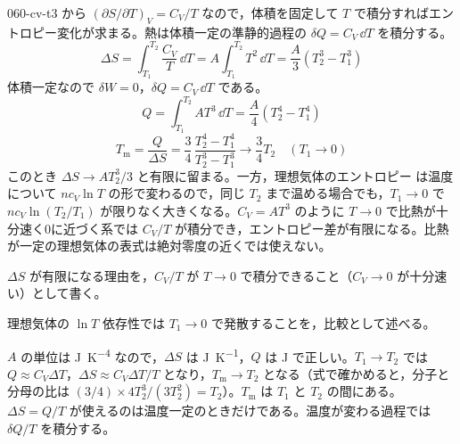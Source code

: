 \documentclass[uplatex,dvipdfmx,a4paper,11pt]{jsarticle}
\begin{document}
\kaitouhen
{}
\begin{kaisetsu}{060-cv-t3}
\houshin {} から $(\partial S/\partial T)_{V} = C_{V}/T$ なので，体積を固定して $T$ で積分すればエントロピー変化が求まる。熱は体積一定の準静的過程の $\delta Q = C_{V}\,\dd T$ を積分する。
\keisan {}
\[ \Delta S = \int_{T_{1}}^{T_{2}} \frac{C_{V}}{T}\,\dd T = A\int_{T_{1}}^{T_{2}} T^{2}\,\dd T = \frac{A}{3}\left(T_{2}^{3} - T_{1}^{3}\right) \]
 体積一定なので $\delta W = 0$，$\delta Q = C_{V}\,\dd T$ である。
\[ Q = \int_{T_{1}}^{T_{2}} AT^{3}\,\dd T = \frac{A}{4}\left(T_{2}^{4} - T_{1}^{4}\right) \]
\[ T_{\mathrm{m}} = \frac{Q}{\Delta S} = \frac{3}{4}\,\frac{T_{2}^{4} - T_{1}^{4}}{T_{2}^{3} - T_{1}^{3}} \longrightarrow \frac{3}{4}T_{2} \quad (T_{1} \to 0) \]
このとき $\Delta S \to AT_{2}^{3}/3$ と有限に留まる。一方，理想気体のエントロピー  は温度について $nc_{V}\ln T$ の形で変わるので，同じ $T_{2}$ まで温める場合でも，$T_{1} \to 0$ で $nc_{V}\ln(T_{2}/T_{1})$ が限りなく大きくなる。$C_{V} = AT^{3}$ のように $T \to 0$ で比熱が十分速く0に近づく系では $C_{V}/T$ が積分でき，エントロピー差が有限になる。比熱が一定の理想気体の表式は絶対零度の近くでは使えない。
\begin{ronten}
  \item {} $\Delta S$ が有限になる理由を，$C_{V}/T$ が $T \to 0$ で積分できること（$C_{V} \to 0$ が十分速い）として書く。
  \item {} 理想気体の $\ln T$ 依存性では $T_{1} \to 0$ で発散することを，比較として述べる。
\end{ronten}
\kenzan $A$ の単位は \unit{\joule\per\kelvin\tothe{4}} なので，$\Delta S$ は \unit{\joule\per\kelvin}，$Q$ は \unit{\joule} で正しい。$T_{1} \to T_{2}$ では $Q \approx C_{V}\Delta T$，$\Delta S \approx C_{V}\Delta T/T$ となり，$T_{\mathrm{m}} \to T_{2}$ となる（式で確かめると，分子と分母の比は $(3/4) \times 4T_{2}^{3}/(3T_{2}^{2}) = T_{2}$）。$T_{\mathrm{m}}$ は $T_{1}$ と $T_{2}$ の間にある。
\tsumazuki $\Delta S = Q/T$ が使えるのは温度一定のときだけである。温度が変わる過程では $\delta Q/T$ を積分する。
\end{kaisetsu}
\end{document}

